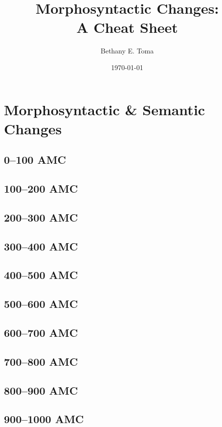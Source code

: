 \documentclass[a4paper,11pt,article,oneside]{memoir}
\title{\langname{} Morphosyntactic Changes:\\{\Large A Cheat Sheet}}
\author{Bethany E. Toma}
\date{\today}
\begin{document}
\maketitle

\section{Morphosyntactic \& Semantic Changes}

\subsection{0--100 AMC}



\subsection{100--200 AMC}



\subsection{200--300 AMC}



\subsection{300--400 AMC}



\subsection{400--500 AMC}



\subsection{500--600 AMC}



\subsection{600--700 AMC}



\subsection{700--800 AMC}



\subsection{800--900 AMC}



\subsection{900--1000 AMC}


\end{document}
